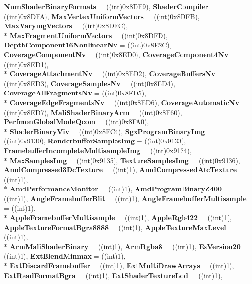 \begin{DoxyCompactItemize}
{\bfseries Num\-Shader\-Binary\-Formats} = ((int)0x8\-D\-F9), 
{\bfseries Shader\-Compiler} = ((int)0x8\-D\-F\-A), 
{\bfseries Max\-Vertex\-Uniform\-Vectors} = ((int)0x8\-D\-F\-B), 
{\bfseries Max\-Varying\-Vectors} = ((int)0x8\-D\-F\-C), 
\\*
{\bfseries Max\-Fragment\-Uniform\-Vectors} = ((int)0x8\-D\-F\-D), 
{\bfseries Depth\-Component16\-Nonlinear\-Nv} = ((int)0x8\-E2\-C), 
{\bfseries Coverage\-Component\-Nv} = ((int)0x8\-E\-D0), 
{\bfseries Coverage\-Component4\-Nv} = ((int)0x8\-E\-D1), 
\\*
{\bfseries Coverage\-Attachment\-Nv} = ((int)0x8\-E\-D2), 
{\bfseries Coverage\-Buffers\-Nv} = ((int)0x8\-E\-D3), 
{\bfseries Coverage\-Samples\-Nv} = ((int)0x8\-E\-D4), 
{\bfseries Coverage\-All\-Fragments\-Nv} = ((int)0x8\-E\-D5), 
\\*
{\bfseries Coverage\-Edge\-Fragments\-Nv} = ((int)0x8\-E\-D6), 
{\bfseries Coverage\-Automatic\-Nv} = ((int)0x8\-E\-D7), 
{\bfseries Mali\-Shader\-Binary\-Arm} = ((int)0x8\-F60), 
{\bfseries Perfmon\-Global\-Mode\-Qcom} = ((int)0x8\-F\-A0), 
\\*
{\bfseries Shader\-Binary\-Viv} = ((int)0x8\-F\-C4), 
{\bfseries Sgx\-Program\-Binary\-Img} = ((int)0x9130), 
{\bfseries Renderbuffer\-Samples\-Img} = ((int)0x9133), 
{\bfseries Framebuffer\-Incomplete\-Multisample\-Img} = ((int)0x9134), 
\\*
{\bfseries Max\-Samples\-Img} = ((int)0x9135), 
{\bfseries Texture\-Samples\-Img} = ((int)0x9136), 
{\bfseries Amd\-Compressed3\-Dc\-Texture} = ((int)1), 
{\bfseries Amd\-Compressed\-Atc\-Texture} = ((int)1), 
\\*
{\bfseries Amd\-Performance\-Monitor} = ((int)1), 
{\bfseries Amd\-Program\-Binary\-Z400} = ((int)1), 
{\bfseries Angle\-Framebuffer\-Blit} = ((int)1), 
{\bfseries Angle\-Framebuffer\-Multisample} = ((int)1), 
\\*
{\bfseries Apple\-Framebuffer\-Multisample} = ((int)1), 
{\bfseries Apple\-Rgb422} = ((int)1), 
{\bfseries Apple\-Texture\-Format\-Bgra8888} = ((int)1), 
{\bfseries Apple\-Texture\-Max\-Level} = ((int)1), 
\\*
{\bfseries Arm\-Mali\-Shader\-Binary} = ((int)1), 
{\bfseries Arm\-Rgba8} = ((int)1), 
{\bfseries Es\-Version20} = ((int)1), 
{\bfseries Ext\-Blend\-Minmax} = ((int)1), 
\\*
{\bfseries Ext\-Discard\-Framebuffer} = ((int)1), 
{\bfseries Ext\-Multi\-Draw\-Arrays} = ((int)1), 
{\bfseries Ext\-Read\-Format\-Bgra} = ((int)1), 
{\bfseries Ext\-Shader\-Texture\-Lod} = ((int)1), 

\end{DoxyCompactItemize}
